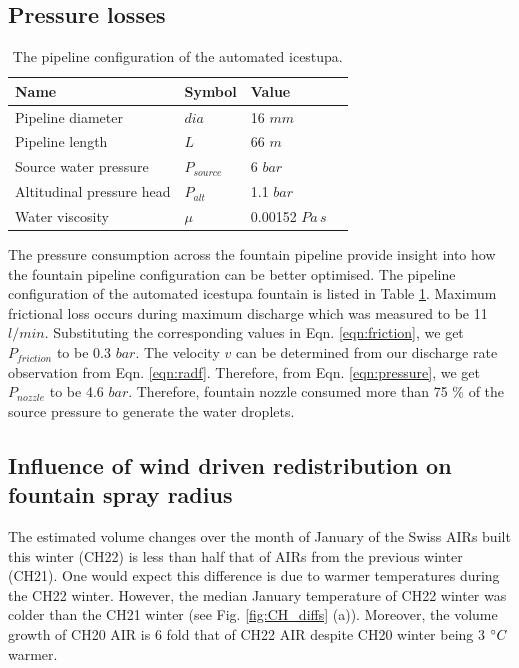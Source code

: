 \documentclass[tc, manuscript]{copernicus}
\begin{document}
\subsection{Pressure losses}


\begin{table}[]
\centering
\caption{The pipeline configuration of the automated icestupa.}
\label{tab:pipe}
\begin{tabular}{@{}llll@{}}
\toprule
\textbf{Name} & \textbf{Symbol} & \textbf{Value} & \\ \midrule
\multicolumn{1}{|l}{Pipeline diameter}      & $dia$ & 16 $mm$ & \multicolumn{1}{l|}{} \\ \midrule
\multicolumn{1}{|l}{Pipeline length}        & $L$ & 66 $m$ & \multicolumn{1}{l|}{} \\ \midrule
\multicolumn{1}{|l}{Source water pressure} & $P_{source}$ & 6 $bar$  & \multicolumn{1}{l|}{} \\\midrule 
\multicolumn{1}{|l}{Altitudinal pressure head}  & $P_{alt}$ & 1.1 $bar$ & \multicolumn{1}{l|}{} \\ \midrule
\multicolumn{1}{|l}{Water viscosity}  & $\mu$ & 0.00152 $Pa\,s$ & \multicolumn{1}{l|}{} \\ \bottomrule
\end{tabular}
\end{table}

The pressure consumption across the fountain pipeline provide insight into how the fountain pipeline
configuration can be better optimised. The pipeline configuration of the automated icestupa fountain is listed
in Table \ref{tab:pipe}. Maximum frictional loss occurs during maximum discharge which was measured to be 11
$l/min$. Substituting the corresponding values in Eqn. \ref{eqn:friction}, we get $P_{friction}$ to be 0.3
$bar$. The velocity $v$ can be determined from our discharge rate observation from Eqn. \ref{eqn:radf}.
Therefore, from Eqn. \ref{eqn:pressure}, we get $P_{nozzle}$ to be 4.6 $bar$. Therefore, fountain nozzle
consumed more than 75 \% of the source pressure to generate the water droplets. 

\subsection{Influence of wind driven redistribution on fountain spray radius}

The estimated volume changes over the month of January of the Swiss AIRs built this winter (CH22) is less than
half that of AIRs from the previous winter (CH21). One would expect this difference is due to warmer
temperatures during the CH22 winter. However, the median January temperature of CH22 winter was colder than the
CH21 winter (see Fig. \ref{fig:CH_diffs} (a)). Moreover, the volume growth of CH20 AIR is 6 fold that of CH22
AIR despite CH20 winter being 3 $^{\circ} C$ warmer.
\end{document}
